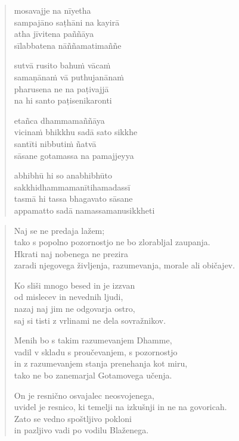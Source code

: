 \clearpage
\begin{verse}

mosavajje na nīyetha\\
sampajāno saṭhāni na kayirā\\
atha jīvitena paññāya\\
sīlabbatena nāññamatimaññe

sutvā rusito bahuṁ vācaṁ\\
samaṇānaṁ vā puthujanānaṁ\\
pharusena ne na paṭivajjā\\
na hi santo paṭisenikaronti

etañca dhammamaññāya\\
vicinaṁ bhikkhu sadā sato sikkhe\\
santīti nibbutiṁ ñatvā\\
sāsane gotamassa na pamajjeyya

abhibhū hi so anabhibhūto\\
sakkhidhammamanītihamadassī\\
tasmā hi tassa bhagavato sāsane\\
appamatto sadā namassamanusikkheti

\end{verse}


\clearpage
\begin{verse}

Naj se ne predaja lažem;\\
tako s popolno pozornostjo ne bo zlorabljal zaupanja.\\
Hkrati naj nobenega ne prezira\\
zaradi njegovega življenja, razumevanja, morale ali običajev.

Ko sliši mnogo besed in je izzvan\\
od mislecev in nevednih ljudi,\\
nazaj naj jim ne odgovarja ostro,\\
saj si tisti z vrlinami ne dela sovražnikov.

Menih bo s takim razumevanjem Dhamme,\\
vadil v skladu s proučevanjem, s pozornostjo\\
in z razumevanjem stanja prenehanja kot miru,\\
tako ne bo zanemarjal Gotamovega učenja.

On je resnično osvajalec neosvojenega,\\
uvidel je resnico, ki temelji na izkušnji in ne na govoricah.\\
Zato se vedno spoštljivo pokloni\\
in pazljivo vadi po vodilu Blaženega.

\end{verse}

